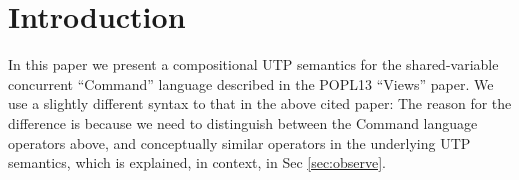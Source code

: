 \section{Introduction}\label{sec:Intro}

In this paper we present a compositional UTP semantics
for the shared-variable concurrent ``Command'' language described
in the POPL13 ``Views'' paper\cite{conf/popl/Dinsdale-YoungBGPY13}.
We use a slightly different syntax to that in the above cited paper:
 \noindent
The reason for the difference is because
we need to distinguish between the Command language operators above,
and conceptually similar operators in the underlying UTP semantics,
which is explained, in context, in Sec \ref{sec:observe}.




